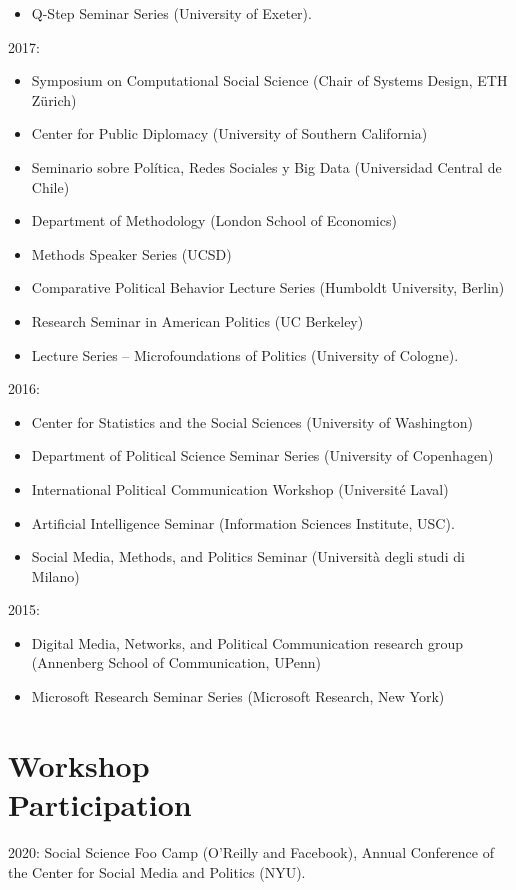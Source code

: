 \documentclass[margin,line,11pt]{resume}
\begin{document}
\begin{resume}
\begin{itemize}
\item Q-Step Seminar Series (University of Exeter).
\end{itemize}
2017:    
\begin{itemize}
\item Symposium on Computational Social Science (Chair of Systems Design, ETH Z\"{u}rich)
\item Center for Public Diplomacy (University of Southern California)
\item Seminario sobre Pol\'{i}tica, Redes Sociales y Big Data (Universidad Central de Chile)
\item Department of Methodology (London School of Economics)
\item Methods Speaker Series (UCSD)
\item Comparative Political Behavior Lecture Series (Humboldt University, Berlin)
\item Research Seminar in American Politics (UC Berkeley)
\item Lecture Series -- Microfoundations of Politics (University of Cologne).
\end{itemize}
2016:
\begin{itemize}
\item Center for Statistics and the Social Sciences (University of Washington)
\item Department of Political Science Seminar Series (University of Copenhagen)
\item International Political Communication Workshop (Universit\'{e} Laval)
\item Artificial Intelligence Seminar (Information Sciences Institute, USC).
\item Social Media, Methods, and Politics Seminar (Universit\`{a} degli studi di Milano)
\end{itemize}
2015:
\begin{itemize}
\item Digital Media, Networks, and Political Communication research group (Annenberg School of Communication, UPenn)
\item Microsoft Research Seminar Series (Microsoft Research, New York)
\end{itemize}

\newpage     
  
        \section{\mysidestyle Workshop\\Participation}
2020: Social Science Foo Camp (O'Reilly and Facebook), Annual Conference of the Center for Social Media and Politics (NYU).
        

\end{resume}
\end{document}
